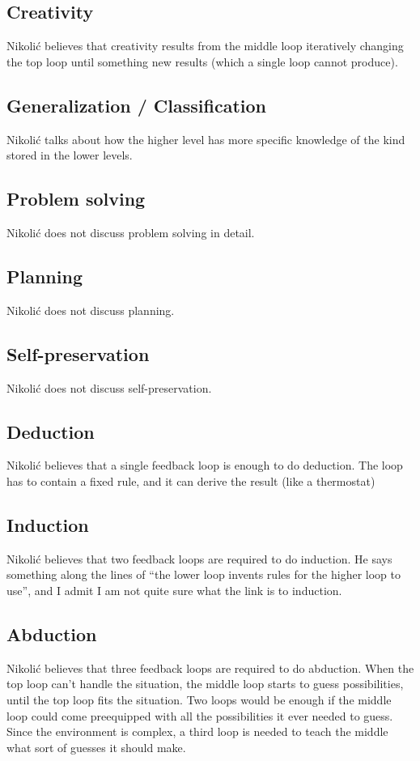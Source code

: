 \documentclass[10pt,a4paper]{article}
\newcommand{\nquote}[1]{``{#1}''}
\begin{document}
\subsection{Creativity}
Nikoli{\'c} believes that creativity results from the middle loop iteratively changing the top loop until something new results (which a single loop cannot produce).

\subsection{Generalization / Classification}
Nikoli{\'c} talks about how the higher level has more specific knowledge of the kind stored in the lower levels.

\subsection{Problem solving}
Nikoli{\'c} does not discuss problem solving in detail.

\subsection{Planning}
Nikoli{\'c} does not discuss planning.

\subsection{Self-preservation}
Nikoli{\'c} does not discuss self-preservation.

\subsection{Deduction}
Nikoli{\'c} believes that a single feedback loop is enough to do deduction. The loop has to contain a fixed rule, and it can derive the result (like a thermostat)

\subsection{Induction}
Nikoli{\'c} believes that two feedback loops are required to do induction. He says something along the lines of \nquote{the lower loop invents rules for the higher loop to use}, and I admit I am not quite sure what the link is to induction.

\subsection{Abduction}
Nikoli{\'c} believes that three feedback loops are required to do abduction. When the top loop can't handle the situation, the middle loop starts to guess possibilities, until the top loop fits the situation. Two loops would be enough if the middle loop could come preequipped with all the possibilities it ever needed to guess. Since the environment is complex, a third loop is needed to teach the middle what sort of guesses it should make.
\end{document}
